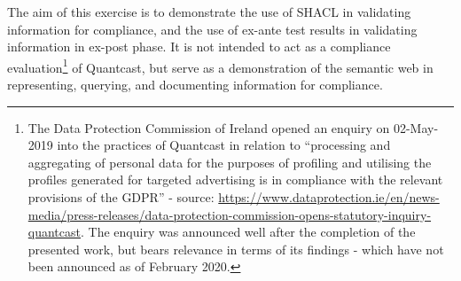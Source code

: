 The aim of this exercise is to demonstrate the use of SHACL in validating information for compliance, and the use of ex-ante test results in validating information in ex-post phase.
It is not intended to act as a compliance evaluation\footnote{The Data Protection Commission of Ireland opened an enquiry on 02-May-2019 into the practices of Quantcast in relation to ``processing and aggregating of personal data for the purposes of profiling and utilising the profiles generated for targeted advertising is in compliance with the relevant provisions of the GDPR'' - source: \url{https://www.dataprotection.ie/en/news-media/press-releases/data-protection-commission-opens-statutory-inquiry-quantcast}. The enquiry was announced well after the completion of the presented work, but bears relevance in terms of its findings - which have not been announced as of February 2020.} of Quantcast, but serve as a demonstration of the semantic web in representing, querying, and documenting information for compliance.


